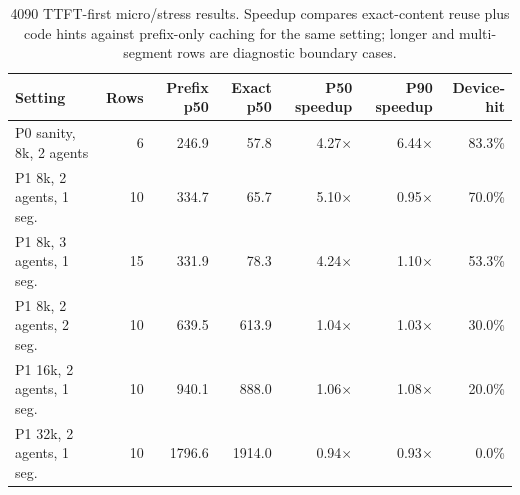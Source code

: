 \begin{table}[t]
\centering
\caption{4090 TTFT-first micro/stress results. Speedup compares exact-content reuse plus code hints against prefix-only caching for the same setting; longer and multi-segment rows are diagnostic boundary cases.}
\label{tab:ttft-stress}
\begin{tabular}{lrrrrrr}
\toprule
Setting & Rows & Prefix p50 & Exact p50 & P50 speedup & P90 speedup & Device-hit \\
\midrule
P0 sanity, 8k, 2 agents & 6 & 246.9 & 57.8 & 4.27$\times$ & 6.44$\times$ & 83.3\% \\
P1 8k, 2 agents, 1 seg. & 10 & 334.7 & 65.7 & 5.10$\times$ & 0.95$\times$ & 70.0\% \\
P1 8k, 3 agents, 1 seg. & 15 & 331.9 & 78.3 & 4.24$\times$ & 1.10$\times$ & 53.3\% \\
P1 8k, 2 agents, 2 seg. & 10 & 639.5 & 613.9 & 1.04$\times$ & 1.03$\times$ & 30.0\% \\
P1 16k, 2 agents, 1 seg. & 10 & 940.1 & 888.0 & 1.06$\times$ & 1.08$\times$ & 20.0\% \\
P1 32k, 2 agents, 1 seg. & 10 & 1796.6 & 1914.0 & 0.94$\times$ & 0.93$\times$ & 0.0\% \\
\bottomrule
\end{tabular}
\end{table}
